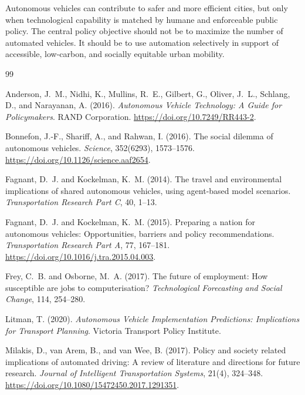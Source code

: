 \documentclass[12pt,a4paper]{article}
\begin{document}
Autonomous vehicles can contribute to safer and more efficient cities, but only when technological capability is matched by humane and enforceable public policy. The central policy objective should not be to maximize the number of automated vehicles. It should be to use automation selectively in support of accessible, low-carbon, and socially equitable urban mobility.

\begin{thebibliography}{99}

Anderson, J.~M., Nidhi, K., Mullins, R.~E., Gilbert, G., Oliver, J.~L., Schlang, D., and Narayanan, A. (2016).
\newblock \emph{Autonomous Vehicle Technology: A Guide for Policymakers}.
\newblock RAND Corporation. \url{https://doi.org/10.7249/RR443-2}.

Bonnefon, J.-F., Shariff, A., and Rahwan, I. (2016).
\newblock The social dilemma of autonomous vehicles.
\newblock \emph{Science}, 352(6293), 1573--1576. \url{https://doi.org/10.1126/science.aaf2654}.

Fagnant, D.~J. and Kockelman, K.~M. (2014).
\newblock The travel and environmental implications of shared autonomous vehicles, using agent-based model scenarios.
\newblock \emph{Transportation Research Part C}, 40, 1--13.

Fagnant, D.~J. and Kockelman, K.~M. (2015).
\newblock Preparing a nation for autonomous vehicles: Opportunities, barriers and policy recommendations.
\newblock \emph{Transportation Research Part A}, 77, 167--181. \url{https://doi.org/10.1016/j.tra.2015.04.003}.

Frey, C.~B. and Osborne, M.~A. (2017).
\newblock The future of employment: How susceptible are jobs to computerisation?
\newblock \emph{Technological Forecasting and Social Change}, 114, 254--280.

Litman, T. (2020).
\newblock \emph{Autonomous Vehicle Implementation Predictions: Implications for Transport Planning}.
\newblock Victoria Transport Policy Institute.

Milakis, D., van Arem, B., and van Wee, B. (2017).
\newblock Policy and society related implications of automated driving: A review of literature and directions for future research.
\newblock \emph{Journal of Intelligent Transportation Systems}, 21(4), 324--348. \url{https://doi.org/10.1080/15472450.2017.1291351}.


\end{thebibliography}
\end{document}
